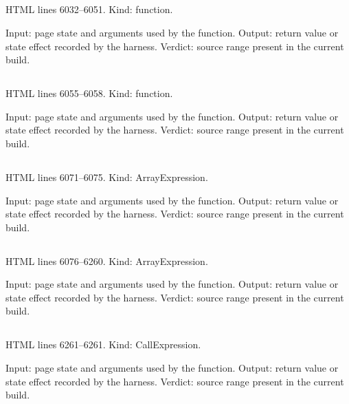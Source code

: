 \subsection*{\texttt{}}
\label{vf_277_ccExtractOnLoad}
HTML lines 6032--6051. Kind: function.

Input: page state and arguments used by the function.
Output: return value or state effect recorded by the harness.
Verdict: source range present in the current build.

\subsection*{\texttt{}}
\label{vf_278_ccProtocolKey}
HTML lines 6055--6058. Kind: function.

Input: page state and arguments used by the function.
Output: return value or state effect recorded by the harness.
Verdict: source range present in the current build.

\subsection*{\texttt{}}
\label{vf_279_CC_GROUPS}
HTML lines 6071--6075. Kind: ArrayExpression.

Input: page state and arguments used by the function.
Output: return value or state effect recorded by the harness.
Verdict: source range present in the current build.

\subsection*{\texttt{}}
\label{vf_280_CC_CHARTS}
HTML lines 6076--6260. Kind: ArrayExpression.

Input: page state and arguments used by the function.
Output: return value or state effect recorded by the harness.
Verdict: source range present in the current build.

\subsection*{\texttt{}}
\label{vf_281_CC_BY_ID}
HTML lines 6261--6261. Kind: CallExpression.

Input: page state and arguments used by the function.
Output: return value or state effect recorded by the harness.
Verdict: source range present in the current build.

